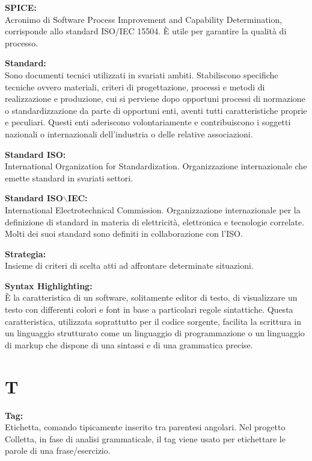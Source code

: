 \documentclass[a4paper, oneside, openany, dvipsnames, table]{article}
\begin{document}
\textbf{SPICE:}\\
Acronimo di Software Process Improvement and Capability Determination, corrisponde allo standard ISO/IEC 15504. \`E utile per garantire la qualità di processo.

\textbf{Standard:}\\	Sono documenti tecnici utilizzati in svariati ambiti. Stabiliscono specifiche tecniche ovvero materiali, criteri di progettazione, processi e metodi di realizzazione e produzione, cui si perviene dopo opportuni processi di normazione o standardizzazione da parte di opportuni enti, aventi tutti caratteristiche proprie e peculiari. Questi enti aderiscono volontariamente e contribuiscono i soggetti nazionali o internazionali dell'industria o delle relative associazioni.

\textbf{Standard ISO:}\\	International Organization for Standardization. Organizzazione internazionale che emette standard in svariati settori.

\textbf{Standard ISO$\backslash$IEC:}\\	International Electrotechnical Commission. Organizzazione internazionale per la definizione di standard in materia di elettricità, elettronica e tecnologie correlate. Molti dei suoi standard sono definiti in collaborazione con l'ISO.

\textbf{Strategia:}\\Insieme di criteri di scelta atti ad affrontare determinate situazioni.

\textbf{Syntax Highlighting:}\\	\`E la caratteristica di un software, 
solitamente editor di testo, di visualizzare un testo con differenti colori e font in base a particolari 
regole sintattiche. Questa caratteristica, utilizzata soprattutto per il codice sorgente, facilita la scrittura 
in un linguaggio strutturato come un linguaggio di programmazione o un linguaggio di markup che dispone di una 
sintassi e di una grammatica precise.
 
\newpage
\section{T}
\textbf{Tag:}\\	Etichetta, comando tipicamente inserito tra parentesi angolari. Nel progetto Colletta, in fase di analisi grammaticale, il tag viene usato per etichettare le parole di una frase/esercizio. 
\end{document}

